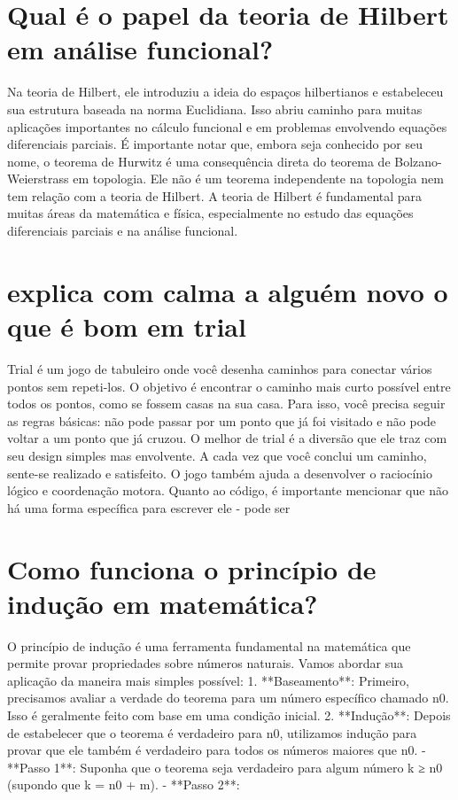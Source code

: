 \documentclass[11pt,a4paper]{article}
\begin{document}
\section{Qual é o papel da teoria de Hilbert em análise funcional?}
Na teoria de Hilbert, ele introduziu a ideia do espaços hilbertianos e estabeleceu sua estrutura baseada na norma Euclidiana. Isso abriu caminho para muitas aplicações importantes no cálculo funcional e em problemas envolvendo equações diferenciais parciais. É importante notar que, embora seja conhecido por seu nome, o teorema de Hurwitz é uma consequência direta do teorema de Bolzano-Weierstrass em topologia. Ele não é um teorema independente na topologia nem tem relação com a teoria de Hilbert. A teoria de Hilbert é fundamental para muitas áreas da matemática e física, especialmente no estudo das equações diferenciais parciais e na análise funcional.

\section{explica com calma a alguém novo o que é bom em trial}
Trial é um jogo de tabuleiro onde você desenha caminhos para conectar vários pontos sem repeti-los. O objetivo é encontrar o caminho mais curto possível entre todos os pontos, como se fossem casas na sua casa. Para isso, você precisa seguir as regras básicas: não pode passar por um ponto que já foi visitado e não pode voltar a um ponto que já cruzou. O melhor de trial é a diversão que ele traz com seu design simples mas envolvente. A cada vez que você conclui um caminho, sente-se realizado e satisfeito. O jogo também ajuda a desenvolver o raciocínio lógico e coordenação motora. Quanto ao código, é importante mencionar que não há uma forma específica para escrever ele - pode ser

\section{Como funciona o princípio de indução em matemática?}
O princípio de indução é uma ferramenta fundamental na matemática que permite provar propriedades sobre números naturais. Vamos abordar sua aplicação da maneira mais simples possível: 1. **Baseamento**: Primeiro, precisamos avaliar a verdade do teorema para um número específico chamado n0. Isso é geralmente feito com base em uma condição inicial. 2. **Indução**: Depois de estabelecer que o teorema é verdadeiro para n0, utilizamos indução para provar que ele também é verdadeiro para todos os números maiores que n0. - **Passo 1**: Suponha que o teorema seja verdadeiro para algum número k ≥ n0 (supondo que k = n0 + m). - **Passo 2**:
\end{document}
